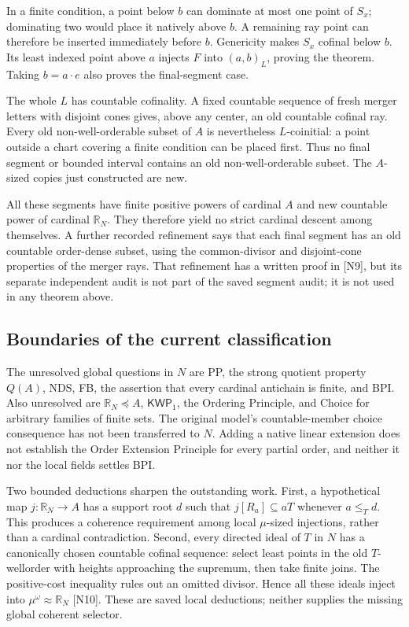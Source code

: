 In a finite condition, a point below $b$ can dominate at most one
point of $S_x$; dominating two would place it natively above $b$.
A remaining ray point can therefore be inserted immediately before
$b$.  Genericity makes $S_x$ cofinal below $b$.  Its least indexed
point above $a$ injects $F$ into $(a,b)_L$, proving the theorem.
Taking $b=a\cdot e$ also proves the final-segment case.

The whole $L$ has countable cofinality.  A fixed countable sequence
of fresh merger letters with disjoint cones gives, above any center,
an old countable cofinal ray.  Every old non-well-orderable subset of
$A$ is nevertheless $L$-coinitial: a point outside a chart covering
a finite condition can be placed first.  Thus no final segment or
bounded interval contains an old non-well-orderable subset.  The
$A$-sized copies just constructed are new.

All these segments have finite positive powers of cardinal $A$ and
new countable power of cardinal $\mathbb R_N$.  They therefore yield
no strict cardinal descent among themselves.  A further recorded
refinement says that each final segment has an old countable
order-dense subset, using the common-divisor and disjoint-cone
properties of the merger rays.  That refinement has a written proof
in [N9], but its separate independent audit is not part of the saved
segment audit; it is not used in any theorem above.

\subsection{Boundaries of the current classification}

The unresolved global questions in $N$ are PP, the strong quotient
property $Q(A)$, NDS, FB, the assertion that every cardinal antichain
is finite, and BPI.
Also unresolved are $\mathbb R_N\preccurlyeq A$,
$\mathsf{KWP}_1$, the Ordering Principle, and Choice for arbitrary
families of finite sets.  The original model's countable-member choice
consequence has not been transferred to $N$.  Adding a native linear
extension does not establish the Order Extension Principle for every
partial order, and neither it nor the local fields settles BPI.

Two bounded deductions sharpen the outstanding work.  First, a
hypothetical map $j:\mathbb R_N\to A$ has a support root $d$ such
that $j[R_a]\subseteq aT$ whenever $a\leq_T d$.  This produces a
coherence requirement among local $\mu$-sized injections, rather than
a cardinal contradiction.  Second, every directed ideal of $T$ in
$N$ has a canonically chosen countable cofinal sequence: select least
points in the old $T$-wellorder with heights approaching the supremum,
then take finite joins.  The positive-cost inequality rules out an
omitted divisor.  Hence all these ideals inject into
$\mu^\omega\approx\mathbb R_N$ [N10].  These are saved local
deductions; neither supplies the missing global coherent selector.

